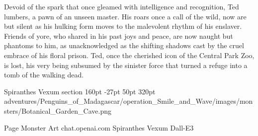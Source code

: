 Devoid of the spark that once gleamed with intelligence and recognition, Ted lumbers, a pawn of an unseen master. His roars once a call of the wild, now are but silent as his hulking form moves to the malevolent rhythm of his enslaver. Friends of yore, who shared in his past joys and peace, are now naught but phantoms to him, as unacknowledged as the shifting shadows cast by the cruel embrace of his floral prison. Ted, once the cherished icon of the Central Park Zoo, is lost, his very being subsumed by the sinister force that turned a refuge into a tomb of the walking dead.

\hfill

\def\primarycolor{titlered}%
\def\secondarycolor{white}%
\MonsterBannerGraphic%
	{Spiranthes Vexum} %
	{section} %
	{160pt} %
	{-27pt} %
	{50pt} %
	{320pt} %
	{\PATH adventures/Penguins_of_Madagascar/operation_Smile_and_Wave/images/monsters/Botanical_Garden_Cave.png} %
	{} %
\label{sec:SpiranthesVexum}
%

%
	{Page \thepage}%
	{Monster Art}%
	{chat.openai.com}%
	{Spiranthes Vexum}%
	{Dall-E3}%

